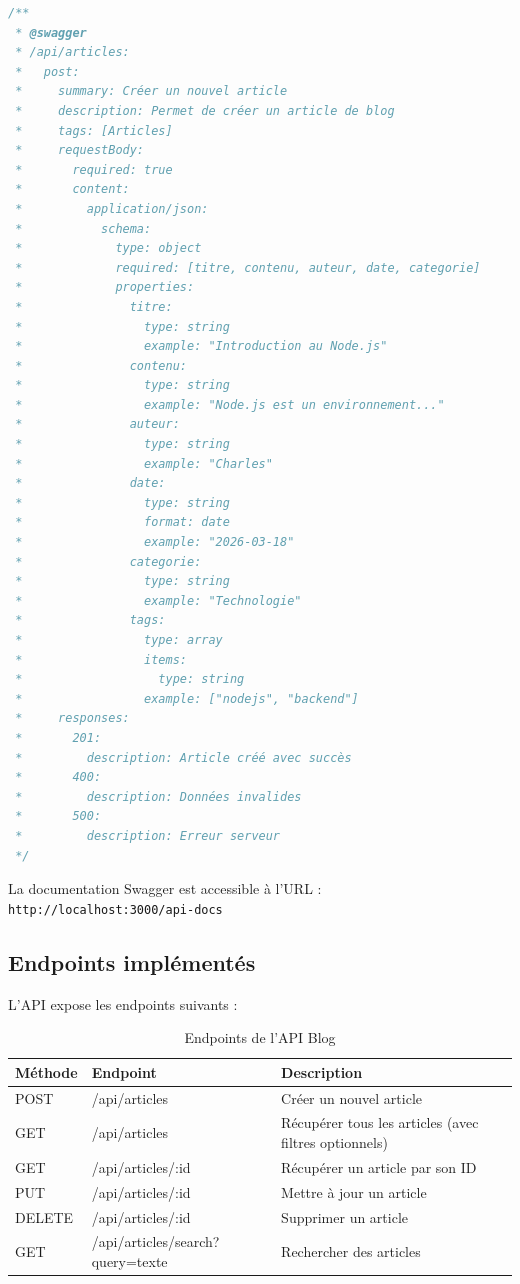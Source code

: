\documentclass[12pt,a4paper]{article}
\begin{document}
\begin{lstlisting}[language=JavaScript, caption=Annotation Swagger - Extrait]
/**
 * @swagger
 * /api/articles:
 *   post:
 *     summary: Créer un nouvel article
 *     description: Permet de créer un article de blog
 *     tags: [Articles]
 *     requestBody:
 *       required: true
 *       content:
 *         application/json:
 *           schema:
 *             type: object
 *             required: [titre, contenu, auteur, date, categorie]
 *             properties:
 *               titre:
 *                 type: string
 *                 example: "Introduction au Node.js"
 *               contenu:
 *                 type: string
 *                 example: "Node.js est un environnement..."
 *               auteur:
 *                 type: string
 *                 example: "Charles"
 *               date:
 *                 type: string
 *                 format: date
 *                 example: "2026-03-18"
 *               categorie:
 *                 type: string
 *                 example: "Technologie"
 *               tags:
 *                 type: array
 *                 items:
 *                   type: string
 *                 example: ["nodejs", "backend"]
 *     responses:
 *       201:
 *         description: Article créé avec succès
 *       400:
 *         description: Données invalides
 *       500:
 *         description: Erreur serveur
 */
\end{lstlisting}

La documentation Swagger est accessible à l'URL : \texttt{http://localhost:3000/api-docs}

\subsection{Endpoints implémentés}

L'API expose les endpoints suivants :

\begin{table}[h]
\centering
\begin{tabular}{|l|l|p{6cm}|}
\hline
\textbf{Méthode} & \textbf{Endpoint} & \textbf{Description} \\
\hline
POST & /api/articles & Créer un nouvel article \\
\hline
GET & /api/articles & Récupérer tous les articles (avec filtres optionnels) \\
\hline
GET & /api/articles/:id & Récupérer un article par son ID \\
\hline
PUT & /api/articles/:id & Mettre à jour un article \\
\hline
DELETE & /api/articles/:id & Supprimer un article \\
\hline
GET & /api/articles/search?query=texte & Rechercher des articles \\
\hline
\end{tabular}
\caption{Endpoints de l'API Blog}
\end{table}
\end{document}

